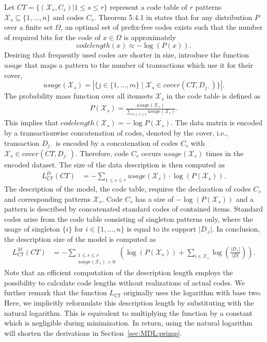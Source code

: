 Let $CT=\{(\mathcal{X}_s,C_s)|1\leq s\leq r\}$ represent a code table of $r$ patterns $\mathcal{X}_s\subseteq\{1,\ldots,n\}$ and codes $C_s$. Theorem 5.4.1 in \cite{cover2012elements} states that for any distribution $P$ over a finite set $\Omega$, an optimal set of prefix-free codes exists such that the number of required bits for the code of $x\in\Omega$ is approximately
\begin{equation*}
	codelength(x) \approx -\log(P(x)).
\end{equation*}
Desiring that frequently used codes are shorter in size, \cite{siebes2006item} introduce the function $usage$ that maps a pattern to the number of transactions which use it for their cover,
\[usage(\mathcal{X}_s)=|\{j\in\{1,\ldots,m\}\mid \mathcal{X}_s\in cover(CT,D_{j\cdot})\}|.\] 
The probability mass function over all itemsets $\mathcal{X}_s$ in the code table  is defined as
\begin{align}\label{eq:krimpCodeProb}
P(\mathcal{X}_s) = \frac{usage(\mathcal{X}_s)}{\sum_{1\leq t \leq r}usage(\mathcal{X}_t)}.
\end{align}
This implies that $codelength(\mathcal{X}_s)=-\log P(\mathcal{X}_s)$. The data matrix is encoded by a transactionwise concatenation of codes, denoted by the cover, i.e., transaction $D_{j\cdot}$ is encoded by a concatenation of codes $C_s$ with $\mathcal{X}_s\in cover(CT,D_{j\cdot})$. Therefore, code $C_s$ occurs $usage(\mathcal{X}_s)$ times in the encoded dataset. The size of the data description is then computed as
\begin{align*}
	L^D_{\mathsf{CT}}(CT)
    &=-\sum_{1\leq s\leq r} usage(\mathcal{X}_s) \cdot \log(P(\mathcal{X}_s)).
\end{align*}
The description of the model, the code table, requires the declaration of codes $C_s$ and corresponding patterns $\mathcal{X}_s$. Code $C_s$ has a size of $-\log\left(P(\mathcal{X}_s)\right)$ and a pattern is described by concatenated standard codes of contained items. Standard codes arise from the code table consisting of singleton patterns only, where the usage of singleton $\{i\}$ for $i\in\{1,\ldots,n\}$ is equal to its support $|D_{\cdot i}|$. In conclusion, the description size of the model is computed as  
\begin{align*}
	L_{\mathsf{CT}}^M(CT)
    &= -\sum_{\substack{1\leq s\leq r \\ usage(\mathcal{X}_s)>0}}\left(\log\left(P(\mathcal{X}_s)\right) +\sum_{i\in \mathcal{X}_s}\log\left(\frac{|D_{\cdot i}|}{|D|}\right)\right).
\end{align*}
Note that an efficient computation of the description length employs the possibility to calculate code lengths without realizations of actual codes.
We further remark that the function $L_{\mathsf{CT}}$ originally uses the logarithm with base two. Here, we implicitly reformulate this description length by substituting with the natural logarithm. This is equivalent to multiplying the function by a constant which is negligible during minimization. In return, using the natural logarithm will shorten the derivations in Section~\ref{sec:MDL:primp}.

